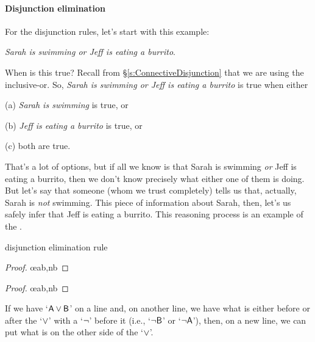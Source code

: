 \paragraph{Disjunction elimination}
For the disjunction rules, let's start with this example: 
\begin{ebullet}
	\item[] \textit{Sarah is swimming or Jeff is eating a burrito}. 
\end{ebullet}
When is this true? Recall from \S \ref{s:ConnectiveDisjunction} that we are using the inclusive-or. So, \textit{Sarah is swimming or Jeff is eating a burrito} is true when either
\begin{ebullet}
	\item[(a)] \textit{Sarah is swimming} is true, or 
	\item[(b)] \textit{Jeff is eating a burrito} is true, or 
	\item[(c)] both are true. 
\end{ebullet}
That's a lot of options, but if all we know is that Sarah is swimming \textit{or} Jeff is eating a burrito, then we don't know precisely what either one of them is doing. But let's say that someone (whom we trust completely) tells us that, actually, Sarah is \textit{not} swimming. This piece of information about Sarah, then, let's us safely infer that Jeff is eating a burrito. This reasoning process is an example of the .

\medskip
\begin{factboxy}{disjunction elimination rule}
\begin{proof}
	 \oe{ab,nb}
\end{proof}

\begin{proof}
	 \oe{ab,nb}
\end{proof}

\small{If we have `$\mathsf{A}\vee\mathsf{B}$' on a line and, on another line, we have what is either before or after the `$\vee$' with a `${\neg}$' before it (i.e., `${\neg}\mathsf{B}$' or `${\neg}\mathsf{A}$'), then, on a new line, we can put what is on the other side of the `$\vee$'.}

\end{factboxy}					%



